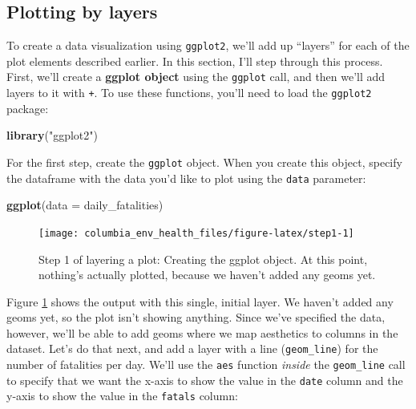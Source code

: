 \documentclass[]{tufte-book}
\newenvironment{Shaded}{}{}
\newcommand{\DataTypeTok}[1]{\textcolor[rgb]{0.56,0.13,0.00}{#1}}
\newcommand{\KeywordTok}[1]{\textcolor[rgb]{0.00,0.44,0.13}{\textbf{#1}}}
\newcommand{\NormalTok}[1]{#1}
\newcommand{\StringTok}[1]{\textcolor[rgb]{0.25,0.44,0.63}{#1}}
\begin{document}
\hypertarget{plotting-by-layers}{%
\subsection{Plotting by layers}\label{plotting-by-layers}}

To create a data visualization using \texttt{ggplot2}, we'll add up ``layers'' for each of
the plot elements described earlier. In this section, I'll step through this process.
First, we'll create a \textbf{ggplot object} using the \texttt{ggplot} call, and then we'll add
layers to it with \texttt{+}. To use these functions, you'll need to load the \texttt{ggplot2}
package:

\begin{Shaded}
\begin{Highlighting}[]
\KeywordTok{library}\NormalTok{(}\StringTok{"ggplot2"}\NormalTok{)}
\end{Highlighting}
\end{Shaded}

For the first step, create the \texttt{ggplot} object. When you create this object, specify
the dataframe with the data you'd like to plot using the \texttt{data} parameter:

\begin{Shaded}
\begin{Highlighting}[]
\KeywordTok{ggplot}\NormalTok{(}\DataTypeTok{data =}\NormalTok{ daily_fatalities)}
\end{Highlighting}
\end{Shaded}

\begin{figure}
\texttt{[image: columbia\_env\_health\_files/figure-latex/step1-1]} \caption[Step 1 of layering a plot]{Step 1 of layering a plot: Creating the ggplot object. At this point, nothing's actually plotted, because we haven't added any geoms yet.}\label{fig:step1}
\end{figure}

Figure \ref{fig:step1} shows the output with this single, initial layer. We haven't added any geoms yet, so the plot isn't showing anything. Since we've specified the
data, however, we'll be able to add geoms where we map aesthetics to columns in the
dataset. Let's do that next, and add a layer with a line (\texttt{geom\_line}) for the number
of fatalities per day. We'll use the \texttt{aes} function \emph{inside} the \texttt{geom\_line} call
to specify that we want the x-axis to show the value in the \texttt{date} column and the
y-axis to show the value in the \texttt{fatals} column:
\end{document}
